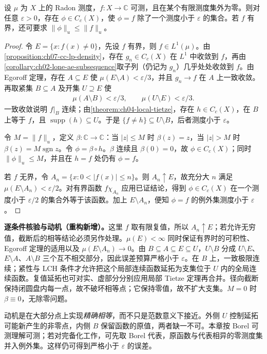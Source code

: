 \documentclass[../../main.tex]{subfiles}
\begin{document}
\begin{theorem}[Lusin 定理]\label{theorem:ch07-lusin}
设 $\mu$ 为 $X$ 上的 Radon 测度，$f:X\to\mathbb C$ 可测，且在某个有限测度集外为零。则对任意 $\varepsilon>0$，存在 $\phi\in C_c(X)$，使 $\phi=f$ 除了一个测度小于 $\varepsilon$ 的集合。若 $f$ 有界，还可要求 $\|\phi\|_u\leqslant\|f\|_u$。
\end{theorem}
\begin{proof}
令 $E=\{x:f(x)\ne0\}$，先设 $f$ 有界，则 $f\in L^1(\mu)$。由\cref{proposition:ch07-cc-lp-density}，存在 $g_n\in C_c(X)$ 在 $L^1$ 中收敛到 $f$，再由\cref{corollary:ch02-lone-ae-subsequence}取子列（仍记为 $g_n$）几乎处处收敛到 $f$。由 Egoroff 定理，存在 $A\subseteq E$ 使 $\mu(E\setminus A)<\varepsilon/3$，并且 $g_n\to f$ 在 $A$ 上一致收敛。再取紧集 $B\subseteq A$ 及开集 $U\supseteq E$ 使
\begin{align*}
\mu(A\setminus B)<\varepsilon/3,\qquad \mu(U\setminus E)<\varepsilon/3.
\end{align*}
一致收敛说明 $f|_B$ 连续；由\cref{theorem:ch04-local-tietze}，存在 $h\in C_c(X)$，在 $B$ 上等于 $f$，且 $\operatorname{supp}(h)\subseteq U$。于是 $\{f\ne h\}\subseteq U\setminus B$，后者测度小于 $\varepsilon$。

令 $M=\|f\|_u$，定义 $\beta:\mathbb C\to\mathbb C$：当 $|z|\leqslant M$ 时 $\beta(z)=z$，当 $|z|>M$ 时 $\beta(z)=M\operatorname{sgn}z$。令 $\phi=\beta\circ h$。$\beta$ 连续且 $\beta(0)=0$，故 $\phi\in C_c(X)$；同时 $\|\phi\|_u\leqslant M$，并且在 $h=f$ 处仍有 $\phi=f$。

若 $f$ 无界，令 $A_n=\{x:0<|f(x)|\leqslant n\}$。则 $A_n\uparrow E$，故充分大 $n$ 满足 $\mu(E\setminus A_n)<\varepsilon/2$。对有界函数 $f\chi_{A_n}$ 应用已证结论，得到 $\phi\in C_c(X)$ 在一个测度小于 $\varepsilon/2$ 的集合外等于该函数。加上 $E\setminus A_n$，便知 $\phi=f$ 的例外集测度小于 $\varepsilon$。
\end{proof}
\begin{remark}
\textbf{逐条件核验与动机（重构新增）。}这里 $f$ 取有限复值，所以 $A_n\uparrow E$；若允许无穷值，截断后的相等结论必须另作处理。$\mu(E)<\infty$ 同时保证有界时的可积性、Egoroff 定理的适用以及 $\mu(E\setminus A_n)\to0$。由 $B\subseteq A\subseteq E\subseteq U$，$U\setminus B$ 分成 $U\setminus E$、$E\setminus A$、$A\setminus B$ 三个互不相交部分，因此误差预算严格小于 $\varepsilon$。在 $B$ 上，一致极限连续；紧性与 LCH 条件才允许把这个局部连续函数延拓为支集位于 $U$ 内的全局连续函数。复值延拓也可对实、虚部分分别应用局部 Tietze 定理再合并。径向截断保持闭圆盘内每一点，故不破坏相等点；它保持零值，故不扩大支集。$M=0$ 时 $\beta\equiv0$，无除零问题。

动机是在大部分点上实现\emph{精确相等}，而不只是范数意义下接近。外侧 $U$ 控制延拓可能新产生的非零点，内侧 $B$ 保留函数的原值，两者缺一不可。本章按 Borel 可测理解可测；若对完备化工作，可先取 Borel 代表，原函数与代表相异的零测度集并入例外集。这样仍可得到严格小于 $\varepsilon$ 的误差。
\end{remark}


\end{document}

